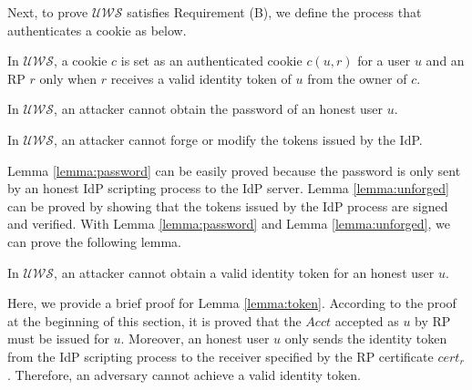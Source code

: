Next, to prove $\mathcal{UWS}$ satisfies Requirement (B), we define the process that authenticates a cookie as below.
\vspace{-\topsep}
\begin{definition}
In $\mathcal{UWS}$, a cookie $c$ is set as an authenticated cookie $c(u,r)$ for a user $u$ and an RP $r$ only when $r$ receives a valid identity token of $u$ from the owner of $c$.
\label{def:cookie}
\end{definition}
\vspace{-\topsep}
\vspace{-\topsep}
\begin{lemma}
In $\mathcal{UWS}$, an attacker cannot obtain the password of an honest user $u$.
\label{lemma:password}
\end{lemma}
\vspace{-\topsep}
\vspace{-\topsep}
\begin{lemma}
In $\mathcal{UWS}$, an attacker cannot forge or modify the tokens issued by the IdP.
\label{lemma:unforged}
\end{lemma}
\vspace{-\topsep}
Lemma \ref{lemma:password} can be easily proved because the password is only sent by an honest IdP scripting process to the IdP server. Lemma \ref{lemma:unforged} can be proved by showing that the tokens issued by the IdP process are signed and verified. With Lemma \ref{lemma:password} and Lemma \ref{lemma:unforged}, we can prove the following lemma.
\vspace{-\topsep}
\begin{lemma}
In $\mathcal{UWS}$, an attacker cannot obtain a valid identity token for an honest user $u$.
\label{lemma:token}
\end{lemma}
\vspace{-\topsep}
Here, we provide a brief proof for Lemma \ref{lemma:token}.
According to the proof at the beginning of this section, it is proved that the $Acct$ accepted as $u$ by RP must be issued for $u$. Moreover,  an honest user $u$ only sends the identity token from the IdP scripting process to the receiver specified by the RP certificate $cert_r$.  Therefore, an adversary cannot achieve a valid identity token.
